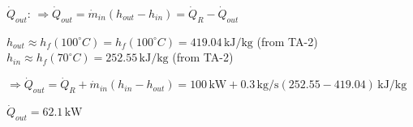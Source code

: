 \( \dot{Q}_{out} \):  
\(\Rightarrow \dot{Q}_{out} = \dot{m}_{in} (h_{out} - h_{in}) = \dot{Q}_R - \dot{Q}_{out}\)  

\( h_{out} \approx h_f(100^\circ C) = h_f(100^\circ C) = 419.04 \, \text{kJ/kg} \) (from TA-2)  
\( h_{in} \approx h_f(70^\circ C) = 252.55 \, \text{kJ/kg} \) (from TA-2)  

\(\Rightarrow \dot{Q}_{out} = \dot{Q}_R + \dot{m}_{in} (h_{in} - h_{out}) = 100 \, \text{kW} + 0.3 \, \text{kg/s} (252.55 - 419.04) \, \text{kJ/kg} \)  

\(\dot{Q}_{out} = 62.1 \, \text{kW} \)